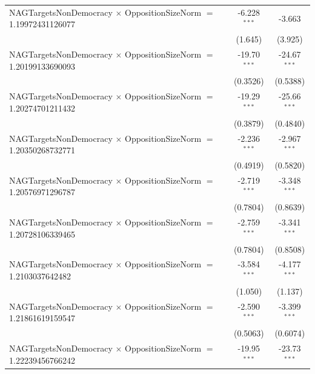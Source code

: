 \begin{tabular}{lcc}
   NAGTargetsNonDemocracy $\times$ OppositionSizeNorm $=$ 1.19972431126077      & -6.228$^{***}$       & -3.663\\   
                                                                                & (1.645)              & (3.925)\\   
   NAGTargetsNonDemocracy $\times$ OppositionSizeNorm $=$ 1.20199133690093      & -19.70$^{***}$       & -24.67$^{***}$\\   
                                                                                & (0.3526)             & (0.5388)\\   
   NAGTargetsNonDemocracy $\times$ OppositionSizeNorm $=$ 1.20274701211432      & -19.29$^{***}$       & -25.66$^{***}$\\   
                                                                                & (0.3879)             & (0.4840)\\   
   NAGTargetsNonDemocracy $\times$ OppositionSizeNorm $=$ 1.20350268732771      & -2.236$^{***}$       & -2.967$^{***}$\\   
                                                                                & (0.4919)             & (0.5820)\\   
   NAGTargetsNonDemocracy $\times$ OppositionSizeNorm $=$ 1.20576971296787      & -2.719$^{***}$       & -3.348$^{***}$\\   
                                                                                & (0.7804)             & (0.8639)\\   
   NAGTargetsNonDemocracy $\times$ OppositionSizeNorm $=$ 1.20728106339465      & -2.759$^{***}$       & -3.341$^{***}$\\   
                                                                                & (0.7804)             & (0.8508)\\   
   NAGTargetsNonDemocracy $\times$ OppositionSizeNorm $=$ 1.2103037642482       & -3.584$^{***}$       & -4.177$^{***}$\\   
                                                                                & (1.050)              & (1.137)\\   
   NAGTargetsNonDemocracy $\times$ OppositionSizeNorm $=$ 1.21861619159547      & -2.590$^{***}$       & -3.399$^{***}$\\   
                                                                                & (0.5063)             & (0.6074)\\   
   NAGTargetsNonDemocracy $\times$ OppositionSizeNorm $=$ 1.22239456766242      & -19.95$^{***}$       & -23.73$^{***}$\\   

\end{tabular}
